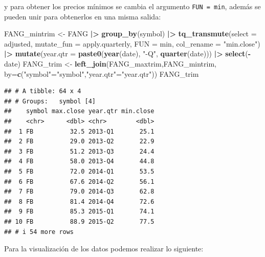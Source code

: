 \documentclass[
]{book}
\newenvironment{Shaded}{\begin{snugshade}}{\end{snugshade}}
\newcommand{\AttributeTok}[1]{\textcolor[rgb]{0.13,0.29,0.53}{#1}}
\newcommand{\FunctionTok}[1]{\textcolor[rgb]{0.13,0.29,0.53}{\textbf{#1}}}
\newcommand{\NormalTok}[1]{#1}
\newcommand{\OtherTok}[1]{\textcolor[rgb]{0.56,0.35,0.01}{#1}}
\newcommand{\SpecialCharTok}[1]{\textcolor[rgb]{0.81,0.36,0.00}{\textbf{#1}}}
\newcommand{\StringTok}[1]{\textcolor[rgb]{0.31,0.60,0.02}{#1}}
\begin{document}
y para obtener los precios mínimos se cambia el argumento \texttt{FUN\ =\ min}, además se pueden unir para obtenerlos en una misma salida:

\begin{Shaded}
\begin{Highlighting}[]
\NormalTok{FANG\_mintrim }\OtherTok{\textless{}{-}}\NormalTok{ FANG }\SpecialCharTok{|\textgreater{}} \FunctionTok{group\_by}\NormalTok{(symbol) }\SpecialCharTok{|\textgreater{}} 
                        \FunctionTok{tq\_transmute}\NormalTok{(}\AttributeTok{select =}\NormalTok{ adjusted,}
                                     \AttributeTok{mutate\_fun =}\NormalTok{ apply.quarterly,}
                                     \AttributeTok{FUN =}\NormalTok{ min,}
                                     \AttributeTok{col\_rename =} \StringTok{"min.close"}\NormalTok{) }\SpecialCharTok{|\textgreater{}} 
                        \FunctionTok{mutate}\NormalTok{(}\AttributeTok{year.qtr =} \FunctionTok{paste0}\NormalTok{(}\FunctionTok{year}\NormalTok{(date), }\StringTok{"{-}Q"}\NormalTok{, }\FunctionTok{quarter}\NormalTok{(date))) }\SpecialCharTok{|\textgreater{}} 
                        \FunctionTok{select}\NormalTok{(}\SpecialCharTok{{-}}\NormalTok{date)}
\NormalTok{FANG\_trim }\OtherTok{\textless{}{-}} \FunctionTok{left\_join}\NormalTok{(FANG\_maxtrim,FANG\_mintrim, }\AttributeTok{by=}\FunctionTok{c}\NormalTok{(}\StringTok{"symbol"}\OtherTok{=}\StringTok{"symbol"}\NormalTok{,}\StringTok{"year.qtr"}\OtherTok{=}\StringTok{"year.qtr"}\NormalTok{))}
\NormalTok{FANG\_trim}
\end{Highlighting}
\end{Shaded}

\begin{verbatim}
## # A tibble: 64 x 4
## # Groups:   symbol [4]
##    symbol max.close year.qtr min.close
##    <chr>      <dbl> <chr>        <dbl>
##  1 FB          32.5 2013-Q1       25.1
##  2 FB          29.0 2013-Q2       22.9
##  3 FB          51.2 2013-Q3       24.4
##  4 FB          58.0 2013-Q4       44.8
##  5 FB          72.0 2014-Q1       53.5
##  6 FB          67.6 2014-Q2       56.1
##  7 FB          79.0 2014-Q3       62.8
##  8 FB          81.4 2014-Q4       72.6
##  9 FB          85.3 2015-Q1       74.1
## 10 FB          88.9 2015-Q2       77.5
## # i 54 more rows
\end{verbatim}

Para la visualización de los datos podemos realizar lo siguiente:
\end{document}
